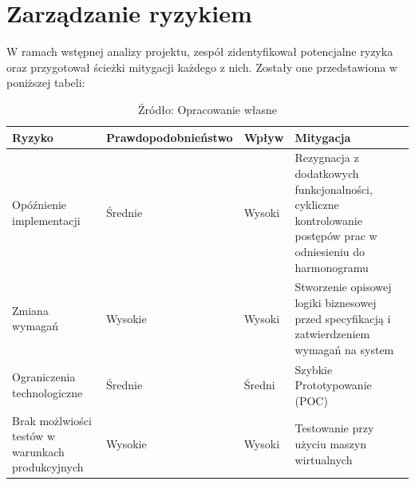 \section{Zarządzanie ryzykiem}
\par W ramach wstępnej analizy projektu, zespół zidentyfikował potencjalne ryzyka oraz przygotował ścieżki mitygacji każdego z nich.
Zostały one przedstawiona w poniższej tabeli:
\begin{table}[h]
    \centering
    \caption{Tabela przedstawiająca ryzyka projektowe}
    \begin{tabularx}{\textwidth}{|p{4cm}|p{4cm}|p{}|X|}
        \hline
        Ryzyko & Prawdopodobnieństwo & Wpływ & Mitygacja \\ \hline
        Opóźnienie implementacji & Średnie & Wysoki & Rezygnacja z dodatkowych funkcjonalności, cykliczne kontrolowanie postępów prac w odniesieniu do harmonogramu \\ \hline
        Zmiana wymagań & Wysokie & Wysoki & Stworzenie opisowej logiki biznesowej przed specyfikacją i zatwierdzeniem wymagań na system \\ \hline
        Ograniczenia technologiczne & Średnie & Średni & Szybkie Prototypowanie (\gls{POC}) \\ \hline
        Brak możlwiości testów w warunkach produkcyjnych & Wysokie & Wysoki & Testowanie przy użyciu maszyn wirtualnych \\ \hline
    \end{tabularx}
    \caption*{Źródło: Opracowanie własne}
\end{table}
